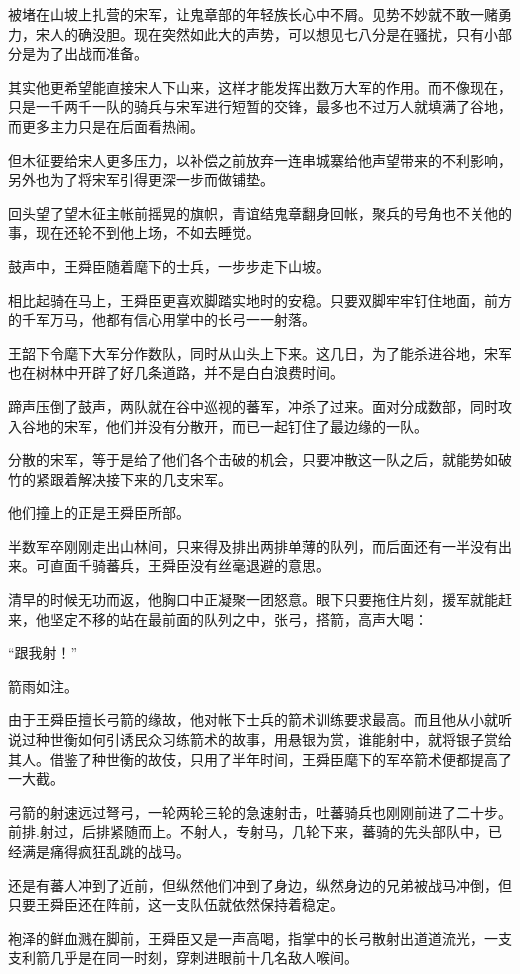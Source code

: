 被堵在山坡上扎营的宋军，让鬼章部的年轻族长心中不屑。见势不妙就不敢一赌勇力，宋人的确没胆。现在突然如此大的声势，可以想见七八分是在骚扰，只有小部分是为了出战而准备。

其实他更希望能直接宋人下山来，这样才能发挥出数万大军的作用。而不像现在，只是一千两千一队的骑兵与宋军进行短暂的交锋，最多也不过万人就填满了谷地，而更多主力只是在后面看热闹。

但木征要给宋人更多压力，以补偿之前放弃一连串城寨给他声望带来的不利影响，另外也为了将宋军引得更深一步而做铺垫。

回头望了望木征主帐前摇晃的旗帜，青谊结鬼章翻身回帐，聚兵的号角也不关他的事，现在还轮不到他上场，不如去睡觉。

鼓声中，王舜臣随着麾下的士兵，一步步走下山坡。

相比起骑在马上，王舜臣更喜欢脚踏实地时的安稳。只要双脚牢牢钉住地面，前方的千军万马，他都有信心用掌中的长弓一一射落。

王韶下令麾下大军分作数队，同时从山头上下来。这几日，为了能杀进谷地，宋军也在树林中开辟了好几条道路，并不是白白浪费时间。

蹄声压倒了鼓声，两队就在谷中巡视的蕃军，冲杀了过来。面对分成数部，同时攻入谷地的宋军，他们并没有分散开，而已一起钉住了最边缘的一队。

分散的宋军，等于是给了他们各个击破的机会，只要冲散这一队之后，就能势如破竹的紧跟着解决接下来的几支宋军。

他们撞上的正是王舜臣所部。

半数军卒刚刚走出山林间，只来得及排出两排单薄的队列，而后面还有一半没有出来。可直面千骑蕃兵，王舜臣没有丝毫退避的意思。

清早的时候无功而返，他胸口中正凝聚一团怒意。眼下只要拖住片刻，援军就能赶来，他坚定不移的站在最前面的队列之中，张弓，搭箭，高声大喝：

“跟我射！”

箭雨如注。

由于王舜臣擅长弓箭的缘故，他对帐下士兵的箭术训练要求最高。而且他从小就听说过种世衡如何引诱民众习练箭术的故事，用悬银为赏，谁能射中，就将银子赏给其人。借鉴了种世衡的故伎，只用了半年时间，王舜臣麾下的军卒箭术便都提高了一大截。

弓箭的射速远过弩弓，一轮两轮三轮的急速射击，吐蕃骑兵也刚刚前进了二十步。前排.射过，后排紧随而上。不射人，专射马，几轮下来，蕃骑的先头部队中，已经满是痛得疯狂乱跳的战马。

还是有蕃人冲到了近前，但纵然他们冲到了身边，纵然身边的兄弟被战马冲倒，但只要王舜臣还在阵前，这一支队伍就依然保持着稳定。

袍泽的鲜血溅在脚前，王舜臣又是一声高喝，指掌中的长弓散射出道道流光，一支支利箭几乎是在同一时刻，穿刺进眼前十几名敌人喉间。

